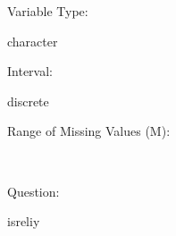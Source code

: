 \documentclass[
]{article}
\begin{document}
\begin{minipage}[t]{0.3\linewidth}

Variable Type:

\end{minipage}%
\begin{minipage}[t]{0.7\linewidth}

character

\end{minipage}

\begin{minipage}[t]{0.3\linewidth}

Interval:

\end{minipage}%
\begin{minipage}[t]{0.7\linewidth}

discrete

\end{minipage}

\begin{minipage}[t]{0.3\linewidth}

Range of Missing Values (M):

\end{minipage}%
\begin{minipage}[t]{0.7\linewidth}

~

\end{minipage}

\begin{minipage}[t]{0.3\linewidth}

Question:

\end{minipage}%
\begin{minipage}[t]{0.7\linewidth}

isreliy

\end{minipage}
\end{document}
